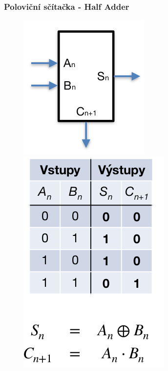 \subsubsection{Poloviční sčítačka - Half Adder}
\begin{figure}[h!]
    \centering
    \begin{minipage}[b]{0.4\textwidth}
        \includegraphics[scale = 0.5]{img/HA.png}
    \end{minipage}
    \hfill
    \begin{minipage}[b]{0.4\textwidth}
        \includegraphics[scale = 0.3]{img/HATab.png}
    \end{minipage}
\end{figure}
